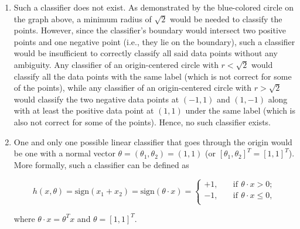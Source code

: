 \documentclass[11pt,fancychapters]{article}
\begin{document}
\begin{enumerate}[label=(\alph*)]

\item Such a classifier does not exist. As demonstrated by the blue-colored circle on the graph above, a minimum radius of $\sqrt{2}$ would be needed to classify the points. However, since the classifier's boundary would intersect two positive points and one negative point (i.e., they lie on the boundary), such a classifier would be insufficient to correctly classify all said data points without any ambiguity. Any classifier of an origin-centered circle with $r < \sqrt{2}$ would classify all the data points with the same label (which is not correct for some of the points), while any classifier of an origin-centered circle with $r > \sqrt{2}$ would classify the two negative data points at $(-1, 1)$ and $(1, -1)$ along with at least the positive data point at $(1, 1)$ under the same label (which is also not correct for some of the points). Hence, no such classifier exists.

\item One and only one possible linear classifier that goes through the origin would be one with a normal vector $\theta = (\theta_1, \theta_2) = (1, 1)$ (or $[\theta_1, \theta_2]^T = [1, 1]^T$). More formally, such a classifier can be defined as

\begin{equation*}
	h(x, \theta) = \text{sign}(x_1 + x_2) = \text{sign}(\theta \cdot x) = \begin{cases}
		+1, \quad &\text{if} \, ~ \theta \cdot x > 0; \\
		-1, \quad &\text{if} \, ~ \theta \cdot x \leq 0, \\
	\end{cases}
\end{equation*}

where $\theta \cdot x = \theta^T x$ and $\theta = [1, 1]^T$.

\end{enumerate}
\end{document}
